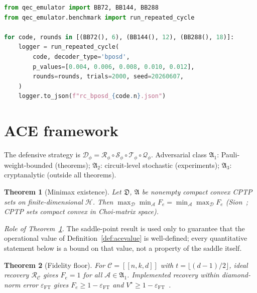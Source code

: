 \documentclass[11pt,a4paper]{article}
\newtheorem{theorem}{Theorem}\newtheorem{lemma}{Lemma}
\begin{document}
\begin{lstlisting}[language=Python,caption={Repeated-cycle benchmark
  across three code sizes (v1.2.4 protocol).}]
from qec_emulator import BB72, BB144, BB288
from qec_emulator.benchmark import run_repeated_cycle

for code, rounds in [(BB72(), 6), (BB144(), 12), (BB288(), 18)]:
    logger = run_repeated_cycle(
        code, decoder_type='bposd',
        p_values=[0.004, 0.006, 0.008, 0.010, 0.012],
        rounds=rounds, trials=2000, seed=20260607,
    )
    logger.to_json(f"rc_bposd_{code.n}.json")
\end{lstlisting}

\section{ACE framework}

The defensive strategy is $\mathcal{D}_\phi = \mathcal{R}_\phi \circ
\mathcal{S}_\phi \circ \mathcal{T}_\phi \circ \mathcal{Q}_\phi$.
Adversarial class $\mathfrak{A}_1$: Pauli-weight-bounded (theorems);
$\mathfrak{A}_2$: circuit-level stochastic (experiments);
$\mathfrak{A}_3$: cryptanalytic (outside all theorems).

\begin{theorem}[Minimax existence]\label{thm:minimax}
Let $\mathfrak{D}$, $\mathfrak{A}$ be nonempty compact convex CPTP sets on
finite-dimensional $\mathcal{H}$.
Then $\max_{\mathcal{D}}\min_{\mathcal{A}} F_e =
\min_{\mathcal{A}}\max_{\mathcal{D}} F_e$ (Sion~\cite{Sion1958}; CPTP
sets compact convex in Choi-matrix space).
\end{theorem}

\noindent\emph{Role of Theorem~\ref{thm:minimax}.} The saddle-point
result is used only to guarantee that the operational value of
Definition~\ref{def:acevalue} is well-defined; every quantitative
statement below is a bound on that value, not a property of the saddle
itself.

\begin{theorem}[Fidelity floor]\label{thm:fidelity-floor}
For $\mathcal{C}=[[n,k,d]]$ with $t=\lfloor(d-1)/2\rfloor$,
ideal recovery $\mathcal{R}_\mathcal{C}$ gives $F_e=1$ for all
$\mathcal{A}\in\mathfrak{A}_1$.
Implemented recovery within diamond-norm error $\varepsilon_\mathrm{FT}$
gives $F_e\ge1-\varepsilon_\mathrm{FT}$ and
$V^\star\ge1-\varepsilon_\mathrm{FT}$~\cite{KnillLaflamme1997,
FuchsVandeGraaf1999}.
\end{theorem}
\end{document}
